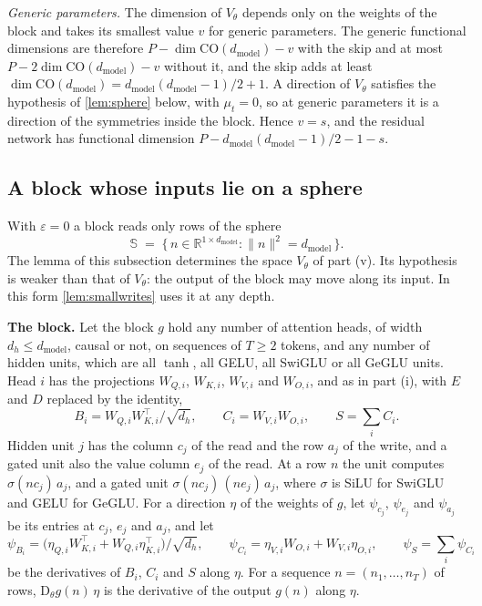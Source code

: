 \documentclass[10pt]{article}
\theoremstyle{definition}
\theoremstyle{remark}
\newcommand{\R}{\mathbb{R}}
\newcommand{\dm}{d_{\mathrm{model}}}
\newcommand{\CO}{\mathrm{CO}}
\newcommand{\Der}{\mathrm{D}}
\newcommand{\norm}[1]{\lVert #1\rVert}
\newcommand{\para}[1]{\smallskip\noindent\textbf{#1}\hspace{0.5em}}
\begin{document}
\emph{Generic parameters.} The dimension of $V_\theta$ depends only on the weights of the block and takes its smallest value $v$ for generic parameters. The generic functional dimensions are therefore $P - \dim\CO(\dm) - v$ with the skip and at most $P - 2\dim\CO(\dm) - v$ without it, and the skip adds at least $\dim\CO(\dm) = \dm(\dm-1)/2 + 1$. A direction of $V_\theta$ satisfies the hypothesis of \cref{lem:sphere} below, with $\mu_t = 0$, so at generic parameters it is a direction of the symmetries inside the block. Hence $v = s$, and the residual network has functional dimension $P - \dm(\dm-1)/2 - 1 - s$.

\subsection*{A block whose inputs lie on a sphere}

With $\varepsilon = 0$ a block reads only rows of the sphere
\[
\mathbb S \;=\; \big\{\,n \in \R^{1\times\dm} : \norm{n}^2 = \dm\,\big\}.
\]
The lemma of this subsection determines the space $V_\theta$ of part (v). Its hypothesis is weaker than that of $V_\theta$: the output of the block may move along its input. In this form \cref{lem:smallwrites} uses it at any depth.

\para{The block.} Let the block $g$ hold any number of attention heads, of width $d_h \le \dm$, causal or not, on sequences of $T \ge 2$ tokens, and any number of hidden units, which are all $\tanh$, all GELU, all SwiGLU or all GeGLU units. Head $i$ has the projections $W_{Q,i}$, $W_{K,i}$, $W_{V,i}$ and $W_{O,i}$, and as in part (i), with $E$ and $D$ replaced by the identity,
\[
B_i = W_{Q,i}W_{K,i}^\top/\sqrt{d_h}, \qquad C_i = W_{V,i}W_{O,i}, \qquad S = \textstyle\sum_i C_i .
\]
Hidden unit $j$ has the column $c_j$ of the read and the row $a_j$ of the write, and a gated unit also the value column $e_j$ of the read. At a row $n$ the unit computes $\sigma(nc_j)\,a_j$, and a gated unit $\sigma(nc_j)\,(ne_j)\,a_j$, where $\sigma$ is SiLU for SwiGLU and GELU for GeGLU. For a direction $\eta$ of the weights of $g$, let $\psi_{c_j}$, $\psi_{e_j}$ and $\psi_{a_j}$ be its entries at $c_j$, $e_j$ and $a_j$, and let
\[
\psi_{B_i} = \big(\eta_{Q,i}W_{K,i}^\top + W_{Q,i}\eta_{K,i}^\top\big)/\sqrt{d_h}, \qquad \psi_{C_i} = \eta_{V,i}W_{O,i} + W_{V,i}\eta_{O,i}, \qquad \psi_S = \textstyle\sum_i \psi_{C_i}
\]
be the derivatives of $B_i$, $C_i$ and $S$ along $\eta$. For a sequence $n = (n_1, \dots, n_T)$ of rows, $\Der_\theta g(n)\,\eta$ is the derivative of the output $g(n)$ along $\eta$.
\end{document}
